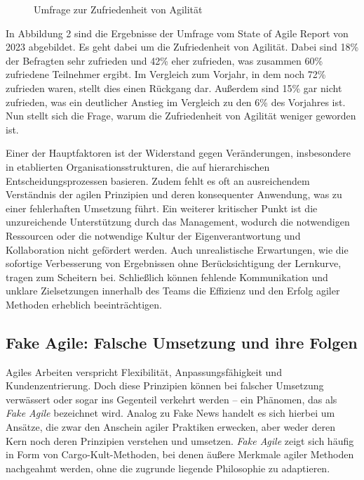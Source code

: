 \documentclass[ngerman]{seminarvorlage}
\begin{document}
\begin{figure}[ht]
    \label{umfrage_}
    \caption{Umfrage zur Zufriedenheit von Agilität}
\end{figure}

In Abbildung 2 sind die Ergebnisse der Umfrage vom State of Agile Report von 2023 abgebildet. Es geht dabei um die Zufriedenheit von Agilität. Dabei sind 18\% der Befragten sehr zufrieden und 42\% eher zufrieden, was zusammen 60\% zufriedene Teilnehmer ergibt. Im Vergleich zum Vorjahr, in dem noch 72\% zufrieden waren, stellt dies einen Rückgang dar. Außerdem sind 15\% gar nicht zufrieden, was ein deutlicher Anstieg im Vergleich zu den 6\% des Vorjahres ist. Nun stellt sich die Frage, warum die Zufriedenheit von Agilität weniger geworden ist.

Einer der Hauptfaktoren ist der Widerstand gegen Veränderungen, insbesondere in etablierten Organisationsstrukturen, die auf hierarchischen Entscheidungsprozessen basieren. 
Zudem fehlt es oft an ausreichendem Verständnis der agilen Prinzipien und deren konsequenter Anwendung, was zu einer fehlerhaften Umsetzung führt. 
Ein weiterer kritischer Punkt ist die unzureichende Unterstützung durch das Management, wodurch die notwendigen Ressourcen oder die notwendige Kultur der Eigenverantwortung und Kollaboration nicht gefördert werden. 
Auch unrealistische Erwartungen, wie die sofortige Verbesserung von Ergebnissen ohne Berücksichtigung der Lernkurve, tragen zum Scheitern bei. Schließlich können fehlende Kommunikation und unklare Zielsetzungen innerhalb des Teams die Effizienz und den Erfolg agiler Methoden erheblich beeinträchtigen.

\subsection{Fake Agile: Falsche Umsetzung und ihre Folgen}

Agiles Arbeiten verspricht Flexibilität, Anpassungsfähigkeit und Kundenzentrierung. Doch diese Prinzipien können bei falscher Umsetzung verwässert oder sogar ins Gegenteil verkehrt werden – ein Phänomen, das als \textit{Fake Agile} bezeichnet wird. Analog zu \glqq Fake News\grqq{} handelt es sich hierbei um Ansätze, die zwar den Anschein agiler Praktiken erwecken, aber weder deren Kern noch deren Prinzipien verstehen und umsetzen. \textit{Fake Agile} zeigt sich häufig in Form von Cargo-Kult-Methoden, bei denen äußere Merkmale agiler Methoden nachgeahmt werden, ohne die zugrunde liegende Philosophie zu adaptieren.
\end{document}

